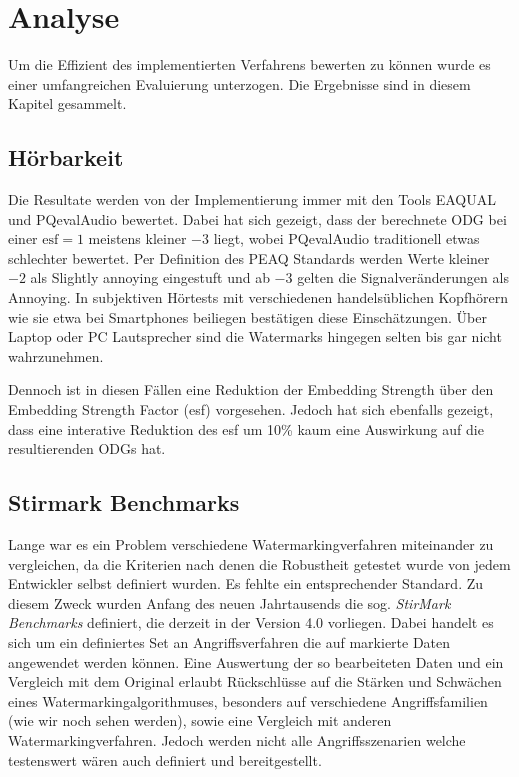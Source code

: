 \chapter{Analyse}
\label{ch:analyse}

Um die Effizient des implementierten Verfahrens bewerten zu können wurde es einer umfangreichen Evaluierung unterzogen. Die Ergebnisse sind in diesem Kapitel gesammelt. 

\section{Hörbarkeit}

Die Resultate werden von der Implementierung immer mit den Tools EAQUAL und PQevalAudio bewertet. Dabei hat sich gezeigt, dass der berechnete ODG bei einer $\mbox{esf}=1$ meistens kleiner $-3$ liegt, wobei PQevalAudio traditionell etwas schlechter bewertet. Per Definition des PEAQ Standards werden Werte kleiner $-2$ als \glqq{}Slightly annoying\grqq{} eingestuft und ab $-3$ gelten die Signalveränderungen als \glqq{}Annoying\grqq{}. In subjektiven Hörtests mit verschiedenen handelsüblichen Kopfhörern wie sie etwa bei Smartphones beiliegen bestätigen diese Einschätzungen. Über Laptop oder PC Lautsprecher sind die Watermarks hingegen selten bis gar nicht wahrzunehmen. 

Dennoch ist in diesen Fällen eine Reduktion der Embedding Strength über den Embedding Strength Factor (esf) vorgesehen. Jedoch hat sich ebenfalls gezeigt, dass eine interative Reduktion des esf um 10\% kaum eine Auswirkung auf die resultierenden ODGs hat.

\section{Stirmark Benchmarks}

Lange war es ein Problem verschiedene Watermarkingverfahren miteinander zu vergleichen, da die Kriterien nach denen die Robustheit getestet wurde von jedem Entwickler selbst definiert wurden. Es fehlte ein entsprechender Standard. Zu diesem Zweck wurden Anfang des neuen Jahrtausends die sog. \textit{StirMark Benchmarks} definiert\cite{petitcolas2000watermarking}\cite{petitcolas2004stirmark}, die derzeit in der Version 4.0 vorliegen. Dabei handelt es sich um ein definiertes Set an Angriffsverfahren die auf markierte Daten angewendet werden können. Eine Auswertung der so bearbeiteten Daten und ein Vergleich mit dem Original erlaubt Rückschlüsse auf die Stärken und Schwächen eines Watermarkingalgorithmuses, besonders auf verschiedene Angriffsfamilien (wie wir noch sehen werden), sowie eine Vergleich mit anderen Watermarkingverfahren. Jedoch werden nicht alle Angriffsszenarien welche testenswert wären auch definiert und bereitgestellt\cite{steinebach2002stirmark}.

